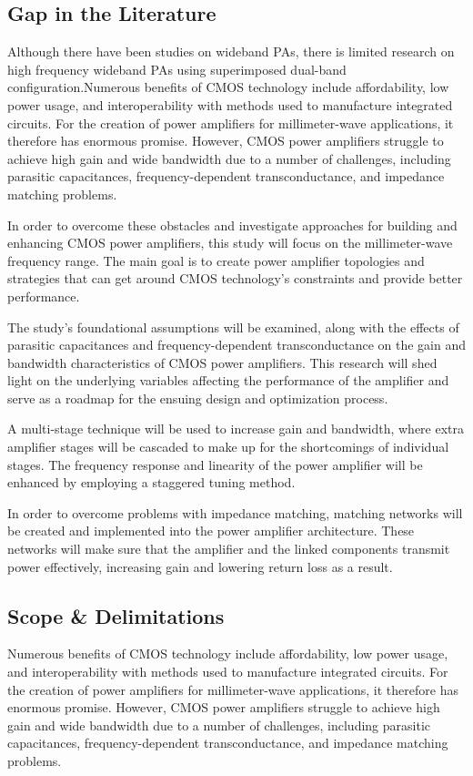 \subsection{Gap in the Literature}
Although there have been studies on wideband PAs, there is limited research on high frequency wideband PAs using superimposed dual-band configuration.Numerous benefits of CMOS technology include affordability, low power usage, and interoperability with methods used to manufacture integrated circuits. For the creation of power
amplifiers for millimeter-wave applications, it therefore has enormous promise. However,
CMOS power amplifiers struggle to achieve high gain and wide bandwidth due to a number
of challenges, including parasitic capacitances, frequency-dependent transconductance, and
impedance matching problems.

In order to overcome these obstacles and investigate approaches for building and enhancing CMOS power amplifiers, this study will focus on the millimeter-wave frequency range. The main goal is to create power amplifier topologies and strategies that can get around CMOS technology's constraints and provide better performance.

The study's foundational assumptions will be examined, along with the effects of parasitic capacitances and frequency-dependent transconductance on the gain and bandwidth characteristics of CMOS power amplifiers. This research will shed light on the underlying variables affecting the performance of the amplifier and serve as a roadmap for the ensuing design and optimization process.

A multi-stage technique will be used to increase gain and bandwidth, where extra amplifier stages will be cascaded to make up for the shortcomings of individual stages. The frequency response and linearity of the power amplifier will be enhanced by employing a staggered tuning method.

In order to overcome problems with impedance matching, matching networks will be created and implemented into the power amplifier architecture. These networks will make sure that the amplifier and the linked components transmit power effectively, increasing gain and lowering return loss as a result.


\subsection{Scope \& Delimitations}
Numerous benefits of CMOS technology include affordability, low power usage, and interoperability with methods used to manufacture integrated circuits. For the creation of power amplifiers for millimeter-wave applications, it therefore has enormous promise. However, CMOS power amplifiers struggle to achieve high gain and wide bandwidth due to a number of challenges, including parasitic capacitances, frequency-dependent transconductance, and impedance matching problems.

